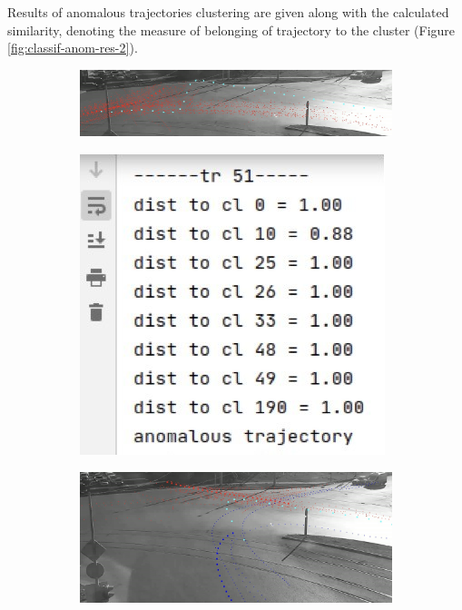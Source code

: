 Results of anomalous trajectories clustering are given along with the calculated similarity, denoting the measure of belonging of trajectory to the cluster (Figure \ref{fig:classif-anom-res-2}).

\begin{figure}[htb!]
	\centering
	\begin{subfigure}[!htb]{0.70\textwidth}
		\centering{}
		\includegraphics[width=\textwidth]{images/classif-res/classif-anom-res-2-1.jpeg}
		\caption{}
	\end{subfigure}
	\hfill
	\begin{subfigure}[!htb]{0.28\textwidth}
		\centering{}
		\includegraphics[width=\textwidth]{images/classif-res/classif-anom-res-2-1-stat.jpeg}
		\caption{}
	\end{subfigure}
	\hfill
	\begin{subfigure}[!htb]{0.70\textwidth}
		\centering{}
		\includegraphics[width=\textwidth]{images/classif-res/classif-anom-res-2-2.jpeg}

\end{subfigure}
\end{figure}
